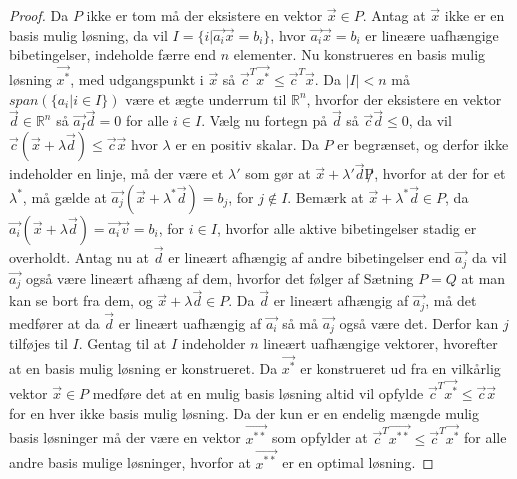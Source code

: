 \begin{proof}
Da $P$ ikke er tom må der eksistere en vektor $\vec{x} \in P$.
Antag at $\vec{x}$ ikke er en basis mulig løsning, da vil $I = \{i | \vec{a_i}\vec{x} = b_i\}$, hvor $\vec{a_i}\vec{x}=b_i$ er lineære uafhængige bibetingelser, indeholde færre end $n$ elementer. 
Nu konstrueres en basis mulig løsning $\vec{x^*}$, med udgangspunkt i $\vec{x}$ så $\vec{c}^T\vec{x^*}\leq \vec{c}^T\vec{x}$.
Da $|I|<n $ må $span(\{a_i | i \in I\})$ være et ægte underrum til $\mathds{R}^n$, hvorfor der eksistere en vektor $\vec{d} \in \mathds{R}^n$ så $\vec{a_I}\vec{d}=0$ for alle $i \in I$. 
Vælg nu fortegn på $\vec{d}$ så $\vec{c}\vec{d} \leq 0$, da vil $\vec{c}(\vec{x}+\lambda\vec{d}) \leq \vec{c}\vec{x}$ hvor $\lambda$ er en positiv skalar.
Da $P$ er begrænset, og derfor ikke indeholder en linje, må der være et $\lambda '$ som gør at $\vec{x}+\lambda '\vec{d} \not P$, hvorfor at der for et $\lambda^*$, må gælde at $\vec{a_j}(\vec{x}+\lambda^* \vec{d}) = b_j$, for $j \notin I$.
Bemærk at $\vec{x}+\lambda^*\vec{d} \in P$, da $\vec{a_i}(\vec{x}+\lambda\vec{d})= \vec{a_i}\vec{v} = b_i$, for $i \in I$, hvorfor alle aktive bibetingelser stadig er overholdt.
Antag nu at $\vec{d}$ er lineært afhængig af andre bibetingelser end $\vec{a_j}$ da vil $\vec{a_j}$ også være lineært afhæng af dem, hvorfor det følger af Sætning $P=Q$ at man kan se bort fra dem, og $\vec{x}+\lambda \vec{d} \in P$. 
Da $\vec{d}$ er lineært afhængig af $\vec{a_j}$, må det medfører at da $\vec{d}$ er lineært uafhængig af $\vec{a_i}$ så må $\vec{a_j}$ også være det. 
Derfor kan $j$ tilføjes til $I$. 
Gentag til at $I$ indeholder $n$ lineært uafhængige vektorer, hvorefter at en basis mulig løsning er konstrueret.
Da $\vec{x^*}$ er konstrueret ud fra en vilkårlig vektor $\vec{x}\in P$ medføre det at en mulig basis løsning altid vil opfylde $\vec{c}^T\vec{x^*} \leq \vec{c}\vec{x}$ for en hver ikke basis mulig løsning. 
Da der kun er en endelig mængde mulig basis løsninger må der være en vektor $\vec{x^{**}}$ som opfylder at $\vec{c}^T\vec{x^{**}}\leq \vec{c}^T\vec{x^*}$ for alle andre basis mulige løsninger, hvorfor at $\vec{x^{**}}$ er en optimal løsning.
\end{proof}